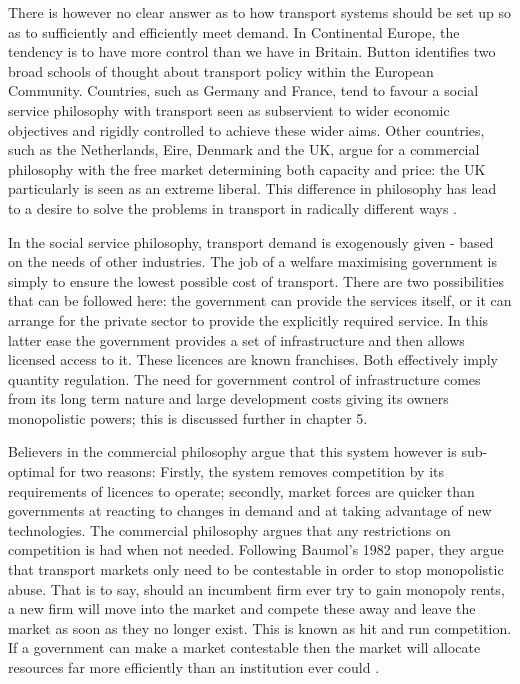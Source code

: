 There is however no clear answer as to how transport systems should be set up so as to sufficiently and efficiently meet demand. In Continental Europe, the tendency is to have more control than we have in Britain. Button identifies two broad schools of thought about transport policy within the European Community. Countries, such as Germany and France, tend to favour a social service philosophy with transport seen as subservient to wider economic objectives and rigidly controlled to achieve these wider aims. Other countries, such as the Netherlands, Eire, Denmark and the UK, argue for a commercial philosophy with the free market determining both capacity and price: the UK particularly is seen as an extreme liberal. This difference in philosophy has lead to a desire to solve the problems in transport in radically different ways \cite{Button:1993}.

In the social service philosophy, transport demand is exogenously given - based on the needs of other industries. The job of a welfare maximising government is simply to ensure the lowest possible cost of transport. There are two possibilities that can be followed here: the government can provide the services itself, or it can arrange for the private sector to provide the explicitly required service. In this latter ease the government provides a set of infrastructure and then allows licensed access to it. These licences are known franchises. Both effectively imply quantity regulation. The need for government control of infrastructure comes from its long term nature and large development costs giving its owners monopolistic powers; this is discussed further in chapter 5.

Believers in the commercial philosophy argue that this system however is sub-optimal for two reasons: Firstly, the system removes competition by its requirements of licences to operate; secondly, market forces are quicker than governments at reacting to changes in demand and at taking advantage of new technologies. The commercial philosophy argues that any restrictions on competition is had when not needed. Following Baumol's 1982 paper, they argue that transport markets only need to be contestable in order to stop monopolistic abuse. That is to say, should an incumbent firm ever try to gain monopoly rents, a new firm will move into the market and compete these away and leave the market as soon as they no longer exist. This is known as hit and run competition. If a government can make a market contestable then the market will allocate resources far more efficiently than an institution ever could \cite{Baumol:1982}.

